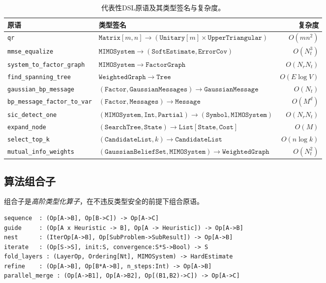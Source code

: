 \documentclass[12pt,a4paper]{article}
\begin{document}
\begin{table}[H]
  \centering
  \caption{代表性DSL原语及其类型签名与复杂度。}
  \label{tab:primitives}
  \small
  \begin{tabular}{@{}p{3.8cm}p{7.2cm}r@{}}
    \toprule
    \textbf{原语} & \textbf{类型签名} & \textbf{复杂度} \\
    \midrule
    \texttt{qr} & $\mathtt{Matrix}[m,n]\to(\mathtt{Unitary}[m]\times\mathtt{UpperTriangular})$ & $O(mn^2)$ \\
    \texttt{mmse\_equalize} & $\mathtt{MIMOSystem}\to(\mathtt{SoftEstimate},\mathtt{ErrorCov})$ & $O(N_t^3)$ \\
    \texttt{system\_to\_factor\_graph} & $\mathtt{MIMOSystem}\to\mathtt{FactorGraph}$ & $O(N_rN_t)$ \\
    \texttt{find\_spanning\_tree} & $\mathtt{WeightedGraph}\to\mathtt{Tree}$ & $O(E\log V)$ \\
    \texttt{gaussian\_bp\_message} & $(\mathtt{Factor},\mathtt{GaussianMessages})\to\mathtt{GaussianMessage}$ & $O(N_t)$ \\
    \texttt{bp\_message\_factor\_to\_var} & $(\mathtt{Factor},\mathtt{Messages})\to\mathtt{Message}$ & $O(M^d)$ \\
    \texttt{sic\_detect\_one} & $(\mathtt{MIMOSystem},\mathtt{Int},\mathtt{Partial})\to(\mathtt{Symbol},\mathtt{MIMOSystem})$ & $O(N_rN_t)$ \\
    \texttt{expand\_node} & $(\mathtt{SearchTree},\mathtt{State})\to\mathtt{List[State,Cost]}$ & $O(M)$ \\
    \texttt{select\_top\_k} & $(\mathtt{CandidateList},k)\to\mathtt{CandidateList}$ & $O(n\log k)$ \\
    \texttt{mutual\_info\_weights} & $(\mathtt{GaussianBeliefSet},\mathtt{MIMOSystem})\to\mathtt{WeightedGraph}$ & $O(N_t^2)$ \\
    \bottomrule
  \end{tabular}
\end{table}

\subsection{算法组合子}

组合子是\emph{高阶类型化算子}，在不违反类型安全的前提下组合原语。

\vspace{0.3em}
\begin{lstlisting}[style=dsl, caption={核心组合子签名}]
sequence  : (Op[A->B], Op[B->C]) -> Op[A->C]
guide     : (Op[A x Heuristic -> B], Op[A -> Heuristic]) -> Op[A->B]
nest      : (IterOp[A->B], Op[SubProblem->SubResult]) -> Op[A->B]
iterate   : (Op[S->S], init:S, convergence:S*S->Bool) -> S
fold_layers : (LayerOp, Ordering[Nt], MIMOSystem) -> HardEstimate
refine    : (Op[A->B], Op[B*A->B], n_steps:Int) -> Op[A->B]
parallel_merge : (Op[A->B1], Op[A->B2], Op[(B1,B2)->C]) -> Op[A->C]
\end{lstlisting}
\end{document}
